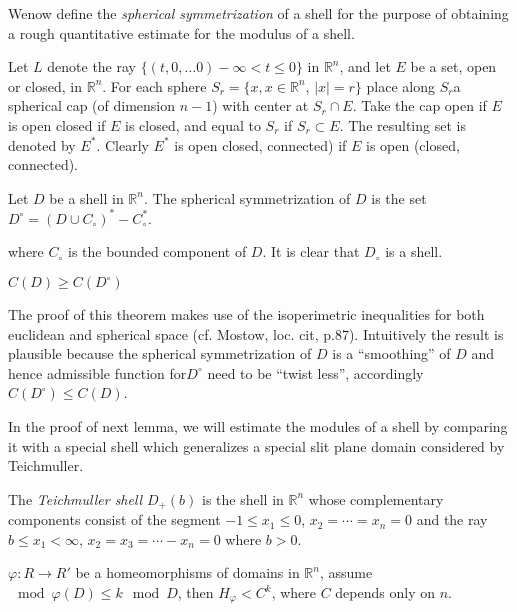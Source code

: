 We\pageoriginale now define the \textit{spherical symmetrization} of a
shell for the purpose of obtaining a rough quantitative estimate for
the modulus of a shell.

Let $L$ denote the ray $\{ (t, 0, \ldots 0) - \infty < t \leq 0\}$ in
$\mathbb{R}^n$, and let $E$ be a set, open or closed, in
$\mathbb{R}^n$. For each sphere $S_r = \{ x, x\in \mathbb{R}^n$,
$|x|=r\}$ place along $S_r$a spherical cap (of dimension $n-1$) with
center at $S_r \cap E$. Take the cap open if $E$ is open closed if $E$
is closed, and equal to $S_r$ if $S_r \subset E$. The resulting set is
denoted by $E^*$. Clearly $E^*$ is open \resp closed,
\resp connected) if $E$ is open (\resp closed, \resp connected).

\begin{defi*}
  Let $D$ be a shell in $\mathbb{R}^n$. The spherical symmetrization
  of $D$ is the set $D^\circ= (D \cup C_\circ)^* - C_\circ^*$.
\end{defi*}
where $C_\circ$ is the bounded component of $D$. It is clear that
$D_\circ$ is a shell.

\begin{thm} \label{chap10:thm10.11}
  $C(D) \geq C(D^\circ)$
\end{thm}

  The proof of this theorem makes  use of the isoperimetric
  inequalities for both euclidean and spherical space (cf. Mostow,
  loc. cit, p.87). Intuitively the result is plausible because the
  spherical symmetrization of $D$ is a ``smoothing'' of $D$ and hence
  admissible function for\pageoriginale $D^\circ$ need to be ``twist less'',
  accordingly $C(D^\circ)\leq C(D)$. 


In the proof of next lemma, we will estimate the modules of a shell by
comparing it with a special shell which generalizes a special slit
plane domain considered by Teichmuller.

\begin{defi*}
  The \textit{Teichmuller shell} $D_+ (b)$ is the shell in
  $\mathbb{R}^n$ whose complementary components consist of the segment
  $-1 \leq x_1 \leq 0$, $x_2 = \cdots = x_n =0$ and the ray $b\leq x_1
  < \infty$, $x_2= x_3 = \cdots - x_n=0$ where $b > 0$.
\end{defi*}

\begin{lemma} \label{chap10:lem10.12}
  $\varphi: R \to R'$ be a homeomorphisms of domains in
  $\mathbb{R}^n$, assume $\mod \varphi(D)\leq k \mod D$, then
  $H_\varphi < C^k$, where $C$ depends only on $n$.
\end{lemma}

